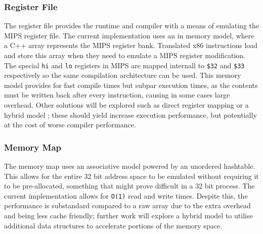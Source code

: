 \subsubsection{Register File}

The register file provides the runtime and compiler with a means of emulating the MIPS register file. The current implementation uses an in memory model, where a C++ array represents the MIPS register bank. Translated x86 instructions load and store this array when they need to emulate a MIPS register modification. The special \texttt{hi} and \texttt{lo} registers in MIPS are mapped internall to \texttt{\$32} and \texttt{\$33} respectively so the same compilation architecture can be used. This memory model provides for fast compile times but subpar execution times, as the contents must be written back after every instruction, causing in some cases large overhead. Other solutions will be explored such as direct register mapping or a hybrid model \cite{mark-probst-dbt}; these should yield increase execution performance, but potentially at the cost of worse compiler performance.

\subsubsection{Memory Map}

The memory map uses an associative model powered by an unordered hashtable. This allows for the entire 32 bit address space to be emulated without requiring it to be pre-allocated, something that might prove difficult in a 32 bit process. The current implementation allows for \texttt{O(1)} read and write times. Despite this, the performance is substandard compared to a raw array due to the extra overhead and being less cache friendly; further work will explore a hybrid model to utilise additional data structures to accelerate portions of the memory space. 